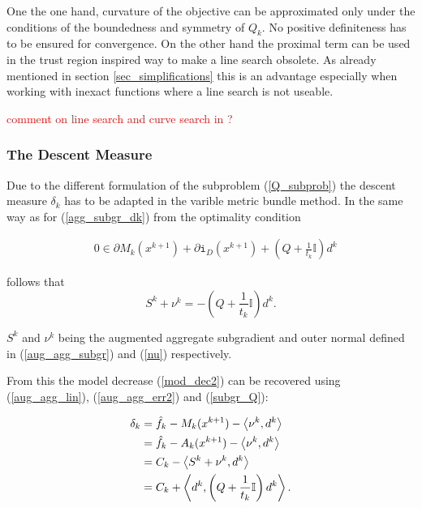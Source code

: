 One the one hand, curvature of the objective can be approximated only under the conditions of the boundedness and symmetry of \(Q_k\). No positive definiteness has to be ensured for convergence.
On the other hand the proximal term can be used in the trust region inspired way to make a line search obsolete. As already mentioned in section \ref{sec_simplifications} this is an advantage especially when working with inexact functions where a line search is not useable.

\textcolor{red}{comment on line search and curve search in \cite{Lemarechal1994,Lemarechal1997,Vlcek2001}?}

\subsubsection{The Descent Measure}

Due to the different formulation of the subproblem (\ref{Q_subprob}) the descent measure \(\delta_k\) has to be adapted in the varible metric bundle method.
In the same way as for (\ref{agg_subgr_dk}) from the optimality condition

\begin{align*}
	& 0 \in \partial M_k(x^{k+1})+\partial\mathtt{i}_{D}(x^{k+1})+\left(Q+\frac{1}{t_k}\mathbb{I}\right)d^k
	\label{Noll_opt_cond}
\end{align*}

follows that 
\begin{equation}
	S^k+\nu^k = -\left(Q+\frac{1}{t_k}\mathbb{I}\right)d^k.
	\label{subgr_Q}
\end{equation}

\(S^k\) and \(\nu^k\) being the augmented aggregate subgradient and outer normal defined in (\ref{aug_agg_subgr}) and (\ref{nu}) respectively.

From this the model decrease (\ref{mod_dec2}) can be recovered using (\ref{aug_agg_lin}), (\ref{aug_agg_err2}) and (\ref{subgr_Q}):

\begin{equation}
\begin{split}
	\delta_k  &= \hat{f}_k - M_k(x^{k+1}) - \left\langle\nu^k,d^k\right\rangle\\
	&= \hat{f}_k - A_k(x^{k+1}) - \left\langle\nu^k,d^k\right\rangle\\
	&= C_k - \left\langle S^k+\nu^k,d^k\right\rangle \\
	&= C_k + \left\langle d^k,\left(Q+\frac{1}{t_k}\mathbb{I}\right)d^k\right\rangle.
	\label{Noll_delta}
\end{split}
\end{equation}

